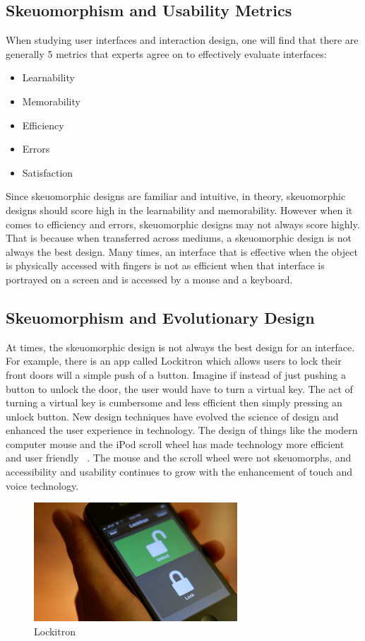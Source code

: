 \documentclass{article}
\begin{document}
\subsection{Skeuomorphism and Usability Metrics}
	When studying user interfaces and interaction design, one will find that there are generally 5 metrics that experts agree on to effectively evaluate interfaces: 
\begin{itemize}
\item Learnability 
\item Memorability 
\item Efficiency 
\item Errors 
\item Satisfaction 
\end{itemize}

	Since skeuomorphic designs are familiar and intuitive, in theory, skeuomorphic designs should score high in the learnability and memorability. However when it comes to efficiency and errors, skeuomorphic designs may not always score highly. That is because when transferred across mediums, a skeuomorphic design is not always the best design. Many times, an interface that is effective when the object is physically accessed with fingers is not as efficient when that interface is portrayed on a screen and is accessed by a mouse and a keyboard. 

\subsection{Skeuomorphism and Evolutionary Design}

At times, the skeuomorphic design is not always the best design for an interface. For example, there is an app called Lockitron which allows users to lock their front doors will a simple push of a button. Imagine if instead of just pushing a button to unlock the door, the user would have to turn a virtual key. The act of turning a virtual key is cumbersome and less efficient then simply pressing an unlock button. New design techniques have evolved the science of design and enhanced the user experience in technology. The design of things like the modern computer mouse and the iPod scroll wheel has made technology more efficient and user friendly ~\cite{ipod}. The mouse and the scroll wheel were not skeuomorphs, and accessibility and usability continues to grow with the enhancement of touch and voice technology. 

\begin{figure}
\centering
\includegraphics[width=3in]{lockitron.jpeg} 

\caption{Lockitron}
\label{Lockitron Smartphone App}
\end{figure}
\end{document}
